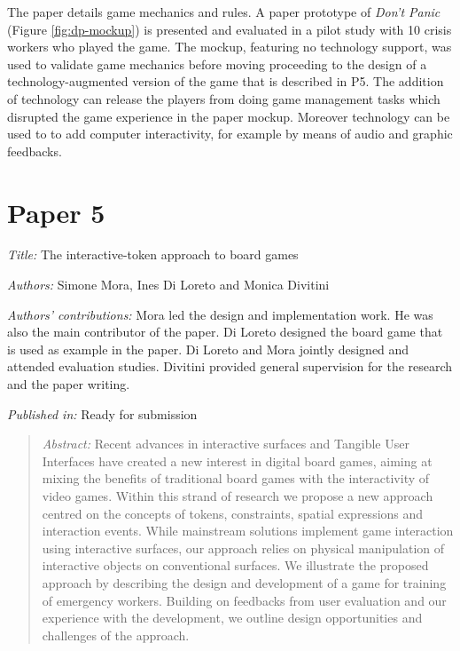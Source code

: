 The paper details game mechanics and rules. A paper prototype of \emph{Don't Panic} (Figure \ref{fig:dp-mockup}) is presented and evaluated in a pilot study with 10 crisis workers who played the game. The mockup, featuring no technology support, was used to validate game mechanics before moving proceeding to the design of a technology-augmented version of the game that is described in P5. The addition of technology can release the players from doing game management tasks which disrupted the game experience in the paper mockup. Moreover technology can be used to to add computer interactivity, for example by means of audio and graphic feedbacks. 



\section[P5: The interactive-token approach to board games][Paper 5]{Paper 5}\label{paper-5}

\emph{Title:} The interactive-token approach to board games

\emph{Authors:} Simone Mora, Ines Di Loreto and Monica Divitini

\emph{Authors' contributions:} Mora led the design and implementation work. He was also the main contributor of the paper. Di Loreto designed the board game that is used as example in the paper. Di Loreto and Mora jointly designed and attended evaluation studies. Divitini provided general supervision for the research and the paper writing.

\emph{Published in:} Ready for submission 

\begin{quote}
	\emph{Abstract:} Recent advances in interactive surfaces and Tangible User Interfaces have created a new interest in digital board games, aiming at mixing the benefits of traditional board games with the interactivity of video games. Within this strand of research we propose a new approach centred on the concepts of tokens, constraints, spatial expressions and interaction events. While mainstream solutions implement game interaction using interactive surfaces, our approach relies on physical manipulation of interactive objects on conventional surfaces. We illustrate the proposed approach by describing the design and development of a game for training of emergency workers. Building on feedbacks from user evaluation and our experience with the development, we outline design opportunities and challenges of the approach. 
\end{quote}

